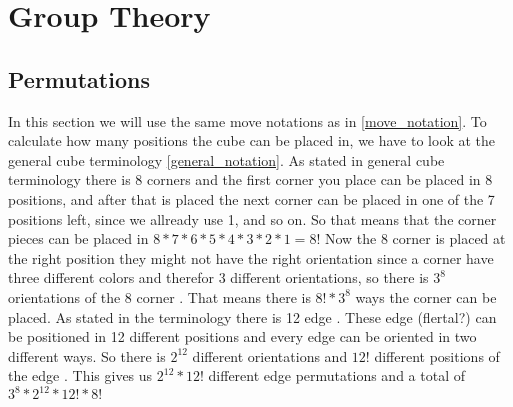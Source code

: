 \chapter{Group Theory}


\section{Permutations}
In this section we will use the same move notations as in \ref{move_notation}.
To calculate how many positions the cube can be placed in, we have to look at the general cube terminology \ref{general_notation}.
As stated in general cube terminology there is 8 corners \cpiece{} and the first corner you place can be placed in 8 positions, and after that is placed the next corner \cpiece{} can be placed in one of the 7 positions left, since we allready use 1, and so on. So that means that the corner pieces can be placed in $8*7*6*5*4*3*2*1=8!$ Now the 8 corner \cpiece{} is placed at the right position they might not have the right orientation since a corner \cpiece{} have three different colors and therefor 3 different orientations, so there is $3^8$ orientations of the 8 corner \cpiece{}. That means there is $8!*3^8$ ways the corner \cpiece{} can be placed. As stated in the terminology there is 12 edge \cpiece{}. These edge \cpiece{} (flertal?) can be positioned in 12 different positions and every edge \cpiece{} can be oriented in two different ways. So there is $2^12$ different orientations and $12!$ different positions of the edge \cpiece{}. This gives us $2^{12}*12!$ different edge permutations and a total of $3^8*2^{12}*12!*8!$



\myTail{
}
%